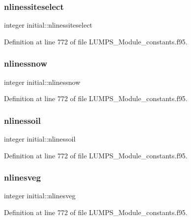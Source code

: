 \subsubsection{\texorpdfstring{nlinessiteselect}{nlinessiteselect}}
{\footnotesize\ttfamily integer initial\+::nlinessiteselect}



Definition at line 772 of file L\+U\+M\+P\+S\+\_\+\+Module\+\_\+constants.\+f95.

\mbox{\label{namespaceinitial_ae61ba75b9e7367f983d542386c9f0674}} 
\subsubsection{\texorpdfstring{nlinessnow}{nlinessnow}}
{\footnotesize\ttfamily integer initial\+::nlinessnow}



Definition at line 772 of file L\+U\+M\+P\+S\+\_\+\+Module\+\_\+constants.\+f95.

\mbox{\label{namespaceinitial_acdc8f5cc81a9f02b6b481ef8d4619400}} 
\subsubsection{\texorpdfstring{nlinessoil}{nlinessoil}}
{\footnotesize\ttfamily integer initial\+::nlinessoil}



Definition at line 772 of file L\+U\+M\+P\+S\+\_\+\+Module\+\_\+constants.\+f95.

\mbox{\label{namespaceinitial_a40dff61f79d7b5523ba09cd9d74903aa}} 
\subsubsection{\texorpdfstring{nlinesveg}{nlinesveg}}
{\footnotesize\ttfamily integer initial\+::nlinesveg}



Definition at line 772 of file L\+U\+M\+P\+S\+\_\+\+Module\+\_\+constants.\+f95.


